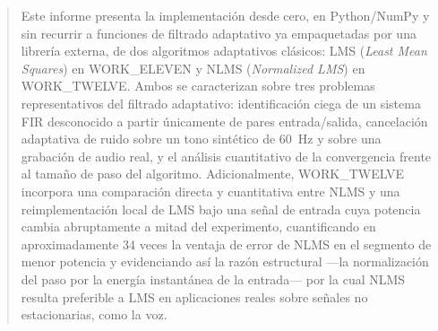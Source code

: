 \begin{abstract}
Este informe presenta la implementación desde cero, en Python/NumPy y
sin recurrir a funciones de filtrado adaptativo ya empaquetadas por
una librería externa, de dos algoritmos adaptativos clásicos: LMS
(\textit{Least Mean Squares}) en WORK\_ELEVEN y NLMS (\textit{Normalized
LMS}) en WORK\_TWELVE. Ambos se caracterizan sobre tres problemas
representativos del filtrado adaptativo: identificación ciega de un
sistema FIR desconocido a partir únicamente de pares entrada/salida,
cancelación adaptativa de ruido sobre un tono sintético de 60~Hz y
sobre una grabación de audio real, y el análisis cuantitativo de la
convergencia frente al tamaño de paso del algoritmo. Adicionalmente,
WORK\_TWELVE incorpora una comparación directa y cuantitativa entre
NLMS y una reimplementación local de LMS bajo una señal de entrada cuya
potencia cambia abruptamente a mitad del experimento, cuantificando en
aproximadamente 34 veces la ventaja de error de NLMS en el segmento de
menor potencia y evidenciando así la razón estructural —la
normalización del paso por la energía instantánea de la entrada— por
la cual NLMS resulta preferible a LMS en aplicaciones reales sobre
señales no estacionarias, como la voz.
\end{abstract}

